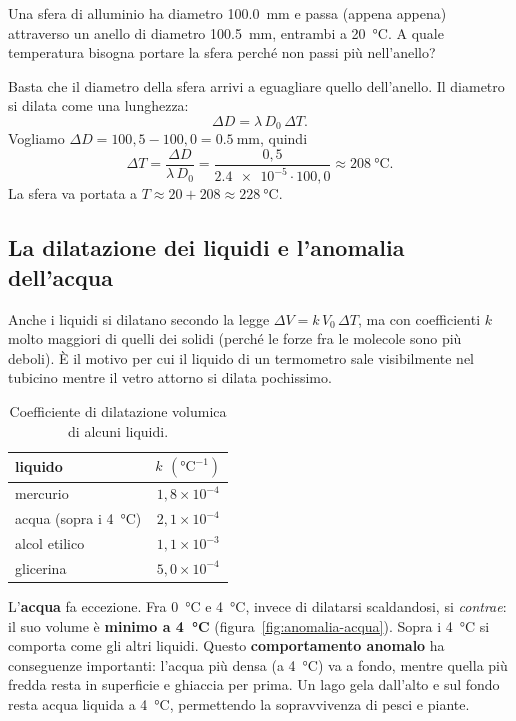 \begin{testexample}
Una sfera di alluminio ha diametro \SI{100,0}{\milli\metre} e passa (appena appena) attraverso un anello di diametro \SI{100,5}{\milli\metre}, entrambi a \SI{20}{\celsius}. A quale temperatura bisogna portare la sfera perché non passi più nell'anello?

Basta che il diametro della sfera arrivi a eguagliare quello dell'anello. Il diametro si dilata come una lunghezza:
\[ \Delta D = \lambda\,D_0\,\Delta T. \]
Vogliamo $\Delta D = 100{,}5 - 100{,}0 = \SI{0,5}{\milli\metre}$, quindi
\[ \Delta T = \frac{\Delta D}{\lambda\,D_0} = \frac{0{,}5}{\num{2,4e-5} \cdot 100{,}0} \approx \SI{208}{\celsius}. \]
La sfera va portata a $T \approx 20 + 208 \approx \SI{228}{\celsius}$.
\end{testexample}

\subsection{La dilatazione dei liquidi e l'anomalia dell'acqua}
Anche i liquidi si dilatano secondo la legge $\Delta V = k\,V_0\,\Delta T$, ma con coefficienti $k$ molto maggiori di quelli dei solidi (perché le forze fra le molecole sono più deboli). È il motivo per cui il liquido di un termometro sale visibilmente nel tubicino mentre il vetro attorno si dilata pochissimo.

\begin{table}[!htbp]
    \centering
    \begin{tabular}{lc}
        \toprule
        liquido & $k$ $(\si{\celsius}^{-1})$ \\
        \midrule
        mercurio & $1{,}8 \times 10^{-4}$ \\
        acqua (sopra i \SI{4}{\celsius}) & $2{,}1 \times 10^{-4}$ \\
        alcol etilico & $1{,}1 \times 10^{-3}$ \\
        glicerina & $5{,}0 \times 10^{-4}$ \\
        \bottomrule
    \end{tabular}
    \caption{Coefficiente di dilatazione volumica di alcuni liquidi.}
    \label{tab:dilatazione-liquidi}
\end{table}

L'\textbf{acqua} fa eccezione. Fra \SI{0}{\celsius} e \SI{4}{\celsius}, invece di dilatarsi scaldandosi, si \emph{contrae}: il suo volume è \textbf{minimo a \SI{4}{\celsius}} (figura~\ref{fig:anomalia-acqua}). Sopra i \SI{4}{\celsius} si comporta come gli altri liquidi. Questo \textbf{comportamento anomalo} ha conseguenze importanti: l'acqua più densa (a \SI{4}{\celsius}) va a fondo, mentre quella più fredda resta in superficie e ghiaccia per prima. Un lago gela dall'alto e sul fondo resta acqua liquida a \SI{4}{\celsius}, permettendo la sopravvivenza di pesci e piante.

